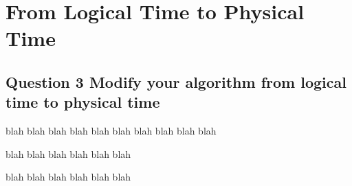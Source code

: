 \chapter{From Logical Time to Physical Time}

\section{Question 3 Modify your algorithm from logical time to physical time}

 blah  blah  blah  blah  blah  blah  blah  blah  blah  blah 

 blah  blah  blah  blah  blah  blah 


 blah  blah  blah  blah  blah  blah 
